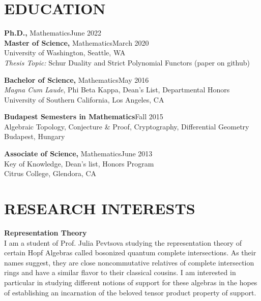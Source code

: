 \documentclass[margin]{res} %
\begin{document}
\begin{resume}



\section{EDUCATION}

{\bf Ph.D.,} Mathematics\hfill June 2022 \\
{\bf Master of Science,} Mathematics\hfill March 2020 \\
University of Washington, Seattle, WA \\
{\it Thesis Topic:} Schur Duality and Strict Polynomial Functors (paper on github)

{\bf Bachelor of Science,} Mathematics\hfill May 2016 \\
{\sl Magna Cum Laude}, Phi Beta Kappa, Dean's List, Departmental Honors \\
University of Southern California, Los Angeles, CA 

{\bf Budapest Semesters in Mathematics}\hfill Fall 2015 \\
Algebraic Topology, Conjecture \& Proof, Cryptography, Differential Geometry  \\
Budapest, Hungary 

{\bf Associate of Science,} Mathematics\hfill June 2013\\
Key of Knowledge, Dean's list, Honors Program \\
Citrus College, Glendora, CA 
 

\section{RESEARCH INTERESTS}

\textbf{Representation Theory}\\
I am a student of Prof. Julia Pevtsova studying the representation theory of certain Hopf Algebras
called bosonized quantum complete intersections. As their names suggest, they are close noncommutative
relatives of complete intersection rings and have a similar flavor to their classical cousins. I am interested 
in particular in studying different notions of support for these algebras in the hopes of establishing
an incarnation of the beloved tensor product property of support.


\end{resume}
\end{document}
